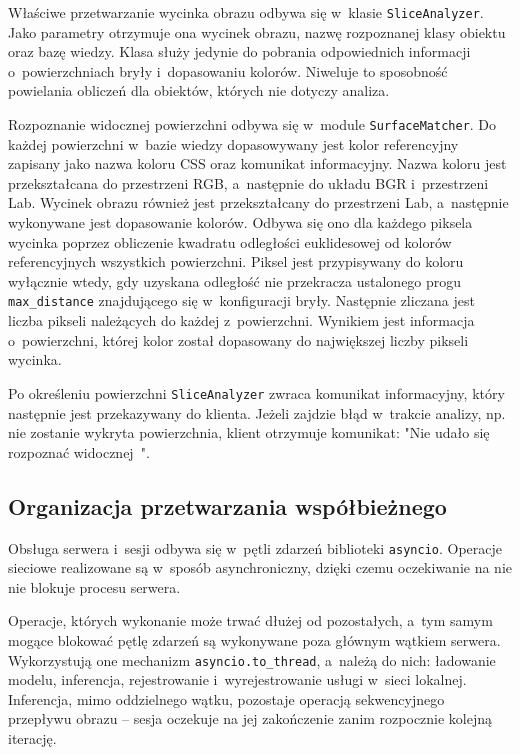 Właściwe przetwarzanie wycinka obrazu odbywa się w~klasie \texttt{SliceAnalyzer}. Jako parametry otrzymuje ona wycinek obrazu, nazwę rozpoznanej klasy obiektu oraz bazę wiedzy. Klasa służy jedynie do pobrania odpowiednich informacji o~powierzchniach bryły i~dopasowaniu kolorów. Niweluje to sposobność powielania obliczeń dla obiektów, których nie dotyczy analiza.

Rozpoznanie widocznej powierzchni odbywa się w~module \texttt{SurfaceMatcher}. Do każdej powierzchni w~bazie wiedzy dopasowywany jest kolor referencyjny zapisany jako nazwa koloru CSS oraz komunikat informacyjny. Nazwa koloru jest przekształcana do przestrzeni RGB, a~następnie do układu BGR i~przestrzeni Lab. Wycinek obrazu również jest przekształcany do przestrzeni Lab, a~następnie wykonywane jest dopasowanie kolorów. Odbywa się ono dla każdego piksela wycinka poprzez obliczenie kwadratu odległości euklidesowej od kolorów referencyjnych wszystkich powierzchni. Piksel jest przypisywany do koloru wyłącznie wtedy, gdy uzyskana odległość nie przekracza ustalonego progu \texttt{max\_distance} znajdującego się w~konfiguracji bryły. Następnie zliczana jest liczba pikseli należących do każdej z~powierzchni. Wynikiem jest informacja o~powierzchni, której kolor został dopasowany do największej liczby pikseli wycinka.

Po określeniu powierzchni \texttt{SliceAnalyzer} zwraca komunikat informacyjny, który następnie jest przekazywany do klienta. Jeżeli zajdzie błąd w~trakcie analizy, np. nie zostanie wykryta powierzchnia, klient otrzymuje komunikat: "Nie udało się rozpoznać widocznej~".

\subsection{Organizacja przetwarzania współbieżnego}

Obsługa serwera i~sesji odbywa się w~pętli zdarzeń biblioteki \texttt{asyncio}. Operacje sieciowe realizowane są w~sposób asynchroniczny, dzięki czemu oczekiwanie na nie nie blokuje procesu serwera.

Operacje, których wykonanie może trwać dłużej od pozostałych, a~tym samym mogące blokować pętlę zdarzeń są wykonywane poza głównym wątkiem serwera. Wykorzystują one mechanizm \texttt{asyncio.to\_thread}, a~należą do nich: ładowanie modelu, inferencja, rejestrowanie i~wyrejestrowanie usługi w~sieci lokalnej. Inferencja, mimo oddzielnego wątku, pozostaje operacją sekwencyjnego przepływu obrazu -- sesja oczekuje na jej zakończenie zanim rozpocznie kolejną iterację.

